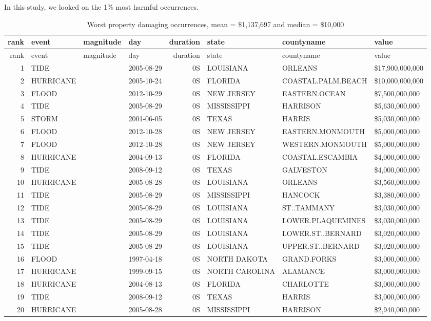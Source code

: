 \documentclass[]{article}
\begin{document}
In this study, we looked on the 1\% most harmful occurrences.

\begin{longtable}[]{@{}rlllrlll@{}}
\caption{Worst property damaging occurrences, mean = \$1,137,697 and
median = \$10,000}\tabularnewline
\toprule
rank & event & magnitude & day & duration & state & countyname &
value\tabularnewline
\midrule
\endfirsthead
\toprule
rank & event & magnitude & day & duration & state & countyname &
value\tabularnewline
\midrule
\endhead
1 & TIDE & & 2005-08-29 & 0S & LOUISIANA & ORLEANS &
\$17,900,000,000\tabularnewline
2 & HURRICANE & & 2005-10-24 & 0S & FLORIDA & COASTAL.PALM.BEACH &
\$10,000,000,000\tabularnewline
3 & FLOOD & & 2012-10-29 & 0S & NEW JERSEY & EASTERN.OCEAN &
\$7,500,000,000\tabularnewline
4 & TIDE & & 2005-08-29 & 0S & MISSISSIPPI & HARRISON &
\$5,630,000,000\tabularnewline
5 & STORM & & 2001-06-05 & 0S & TEXAS & HARRIS &
\$5,030,000,000\tabularnewline
6 & FLOOD & & 2012-10-28 & 0S & NEW JERSEY & EASTERN.MONMOUTH &
\$5,000,000,000\tabularnewline
7 & FLOOD & & 2012-10-28 & 0S & NEW JERSEY & WESTERN.MONMOUTH &
\$5,000,000,000\tabularnewline
8 & HURRICANE & & 2004-09-13 & 0S & FLORIDA & COASTAL.ESCAMBIA &
\$4,000,000,000\tabularnewline
9 & TIDE & & 2008-09-12 & 0S & TEXAS & GALVESTON &
\$4,000,000,000\tabularnewline
10 & HURRICANE & & 2005-08-28 & 0S & LOUISIANA & ORLEANS &
\$3,560,000,000\tabularnewline
11 & TIDE & & 2005-08-29 & 0S & MISSISSIPPI & HANCOCK &
\$3,380,000,000\tabularnewline
12 & TIDE & & 2005-08-29 & 0S & LOUISIANA & ST..TAMMANY &
\$3,030,000,000\tabularnewline
13 & TIDE & & 2005-08-29 & 0S & LOUISIANA & LOWER.PLAQUEMINES &
\$3,030,000,000\tabularnewline
14 & TIDE & & 2005-08-29 & 0S & LOUISIANA & LOWER.ST..BERNARD &
\$3,020,000,000\tabularnewline
15 & TIDE & & 2005-08-29 & 0S & LOUISIANA & UPPER.ST..BERNARD &
\$3,020,000,000\tabularnewline
16 & FLOOD & & 1997-04-18 & 0S & NORTH DAKOTA & GRAND.FORKS &
\$3,000,000,000\tabularnewline
17 & HURRICANE & & 1999-09-15 & 0S & NORTH CAROLINA & ALAMANCE &
\$3,000,000,000\tabularnewline
18 & HURRICANE & & 2004-08-13 & 0S & FLORIDA & CHARLOTTE &
\$3,000,000,000\tabularnewline
19 & TIDE & & 2008-09-12 & 0S & TEXAS & HARRIS &
\$3,000,000,000\tabularnewline
20 & HURRICANE & & 2005-08-28 & 0S & MISSISSIPPI & HARRISON &
\$2,940,000,000\tabularnewline
\bottomrule
\end{longtable}
\end{document}
